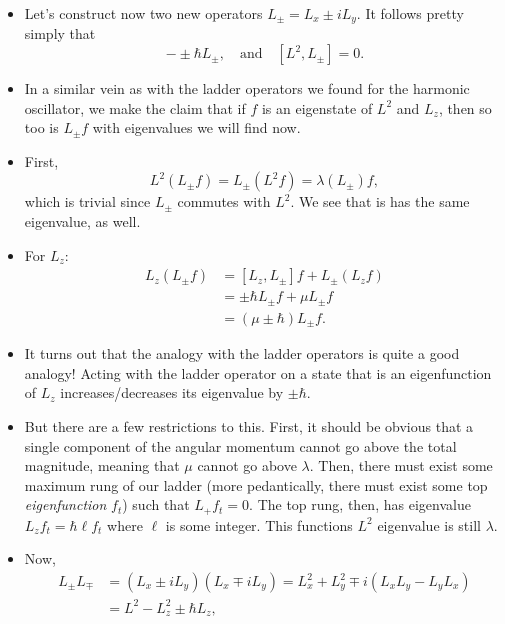 \begin{itemize}
    \item Let's construct now two new operators $L_{\pm} = L_x \pm iL_y$. It follows pretty simply that 
        \begin{equation}
            [L_z, L_{\pm}] - \pm\hbar L_{\pm}, \quad\mathrm{and}\quad [L^2,L_{\pm}] = 0.
        \end{equation}
    \item In a similar vein as with the ladder operators we found for the harmonic oscillator, we make the claim that if $f$ is an eigenstate of $L^2$ and $L_z$, then so too is $L_{\pm}f$ with eigenvalues we will find now.
    \item First,
        \begin{equation}
            L^2(L_{\pm}f) = L_{\pm}(L^2f) = \lambda(L_{\pm})f,
        \end{equation}
        which is trivial since $L_{\pm}$ commutes with $L^2$. We see that is has the same eigenvalue, as well.
    \item For $L_z$:
        \begin{align}
            L_z(L_{\pm}f) &= [L_z,L_{\pm}]f + L_{\pm}(L_zf) \\
            &= \pm\hbar L_{\pm}f + \mu L_{\pm}f \\
            &= (\mu \pm \hbar)L_{\pm}f.
        \end{align}
    \item It turns out that the analogy with the ladder operators is quite a good analogy! Acting with the ladder operator on a state that is an eigenfunction of $L_z$ increases/decreases its eigenvalue by $\pm\hbar$.
    \item But there are a few restrictions to this. First, it should be obvious that a single component of the angular momentum cannot go above the total magnitude, meaning that $\mu$ cannot go above $\lambda$. Then, there must exist some maximum rung of our ladder (more pedantically, there must exist some top \textit{eigenfunction} $f_t$) such that $L_+ f_t = 0$. The top rung, then, has eigenvalue $L_z f_t = \hbar \ell f_t$ where $\ell$ is some integer. This functions $L^2$ eigenvalue is still $\lambda$.
    \item Now,
        \begin{align}
            L_{\pm}L_{\mp} &= (L_x \pm iL_y)(L_x \mp iL_y) = L_x^2 + L_y^2 \mp i(L_xL_y - L_yL_x) \\
            &= L^2 - L_z^2 \pm \hbar L_z,
        \end{align}

\end{itemize}
